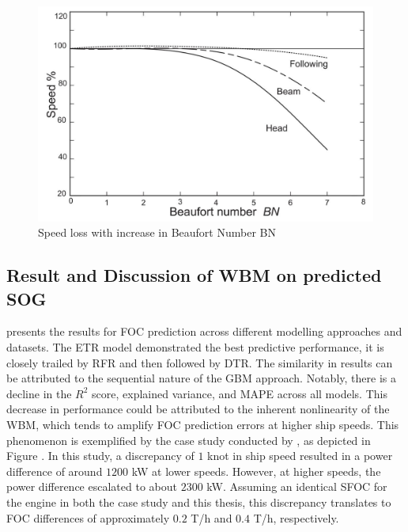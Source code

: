 \begin{figure}[ht]
    \centering
    \includegraphics[width=.7\linewidth]{02_figures/molland17_speedlosscurve.jpg}
    \caption{Speed loss with increase in Beaufort Number BN }
    \label{fig:molland17_speedloss_windwave}
\end{figure}

\subsection{Result and Discussion of WBM on predicted SOG}\label{sec:WBM_result_discussion}

 presents the results for FOC prediction across different modelling approaches and datasets. The ETR model demonstrated the best predictive performance, it is closely trailed by RFR and then followed by DTR. The similarity in results can be attributed to the sequential nature of the GBM approach. Notably, there is a decline in the $R^2$ score, explained variance, and MAPE across all models. This decrease in performance could be attributed to the inherent nonlinearity of the WBM, which tends to amplify FOC prediction errors at higher ship speeds. This phenomenon is exemplified by the case study conducted by , as depicted in Figure . In this study, a discrepancy of $1$ knot in ship speed resulted in a power difference of around $1200$ kW at lower speeds. However, at higher speeds, the power difference escalated to about $2300$ kW. Assuming an identical SFOC for the engine in both the  case study and this thesis, this discrepancy translates to FOC differences of approximately $0.2$ T/h and $0.4$ T/h, respectively.


